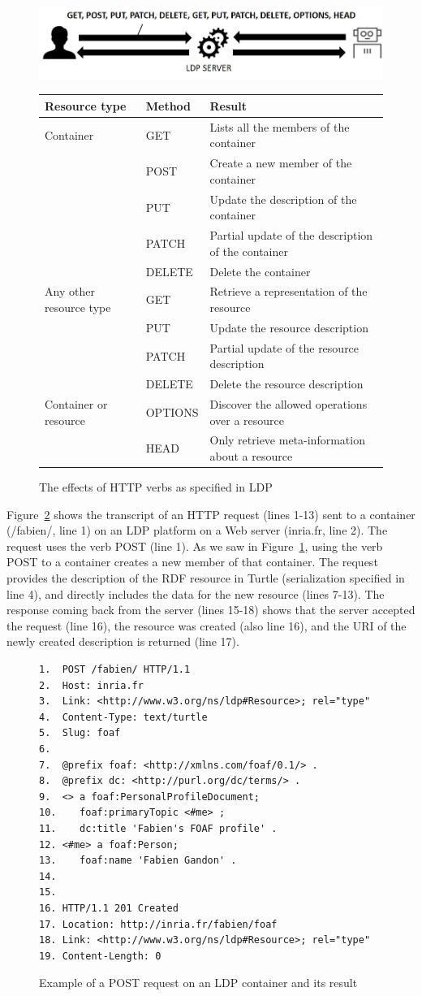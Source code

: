 \begin{figure}
\includegraphics[width=5.0in]{media/ch5/figure-05-17.jpg}
\begin{tabular}{|lll|}
\hline
\textbf{Resource type} & \textbf{Method} & \textbf{Result}\tabularnewline
\hline\hline
Container & GET & Lists all the members of the container\tabularnewline
& POST & Create a new member of the container\tabularnewline
& PUT & Update the description of the container\tabularnewline
& PATCH & Partial update of the description of the
container\tabularnewline
& DELETE & Delete the container\tabularnewline
\hline
Any other resource type & GET & Retrieve a representation of the
resource\tabularnewline
& PUT & Update the resource description\tabularnewline
& PATCH & Partial update of the resource description\tabularnewline
& DELETE & Delete the resource description\tabularnewline
\hline\hline
Container or resource & OPTIONS & Discover the allowed operations over a
resource\tabularnewline
& HEAD & Only retrieve meta-information about a resource\tabularnewline
\hline
\end{tabular}
 \caption{The effects of HTTP verbs as specified in LDP\label{fig:ch5.17}}
\end{figure}


Figure~\ref{fig:ch5.18} shows the transcript of an HTTP request (lines 1-13) sent to a
container (/fabien/, line 1) on an LDP platform on a Web server
(inria.fr, line 2). The request uses the verb POST (line 1). As we saw in 
Figure~\ref{fig:ch5.17}, using the verb POST to a container creates a new member of that container. The
request provides the description of the RDF resource in Turtle
(serialization specified in line 4), and directly includes the data for
the new resource (lines 7-13). The response coming back from the server 
(lines
15-18) shows that the server accepted the request  (line 16), the
resource was created (also line 16), and the URI of the
newly created description is returned (line 17).

\begin{figure}

\begin{lstlisting}
1.	POST /fabien/ HTTP/1.1
2.	Host: inria.fr
3.	Link: <http://www.w3.org/ns/ldp#Resource>; rel="type"
4.	Content-Type: text/turtle
5.	Slug: foaf
6.	
7.	@prefix foaf: <http://xmlns.com/foaf/0.1/> .
8.	@prefix dc: <http://purl.org/dc/terms/> .
9.	<> a foaf:PersonalProfileDocument;
10.	   foaf:primaryTopic <#me> ;
11.    dc:title 'Fabien's FOAF profile' .
12.	<#me> a foaf:Person;
13.	   foaf:name 'Fabien Gandon' .
14.	 
15.	 
16.	HTTP/1.1 201 Created
17.	Location: http://inria.fr/fabien/foaf
18.	Link: <http://www.w3.org/ns/ldp#Resource>; rel="type"
19.	Content-Length: 0

\end{lstlisting}  
  \caption{Example of a POST request on an LDP container and its result   \label{fig:ch5.18}}
  \end{figure}

